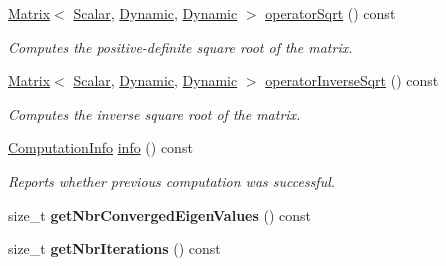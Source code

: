 \begin{DoxyCompactItemize}
\hyperlink{group___core___module_class_eigen_1_1_matrix}{Matrix}$<$ \hyperlink{class_eigen_1_1_arpack_generalized_self_adjoint_eigen_solver_ab1182405bfe87a505d4b7a8311c661ec}{Scalar}, \hyperlink{namespace_eigen_ad81fa7195215a0ce30017dfac309f0b2}{Dynamic}, \hyperlink{namespace_eigen_ad81fa7195215a0ce30017dfac309f0b2}{Dynamic} $>$ \hyperlink{class_eigen_1_1_arpack_generalized_self_adjoint_eigen_solver_a7522aad061ebccc065b254c0bc67d3b0}{operator\+Sqrt} () const
\begin{DoxyCompactList}\small\item\em Computes the positive-\/definite square root of the matrix. \end{DoxyCompactList}\item 
\hyperlink{group___core___module_class_eigen_1_1_matrix}{Matrix}$<$ \hyperlink{class_eigen_1_1_arpack_generalized_self_adjoint_eigen_solver_ab1182405bfe87a505d4b7a8311c661ec}{Scalar}, \hyperlink{namespace_eigen_ad81fa7195215a0ce30017dfac309f0b2}{Dynamic}, \hyperlink{namespace_eigen_ad81fa7195215a0ce30017dfac309f0b2}{Dynamic} $>$ \hyperlink{class_eigen_1_1_arpack_generalized_self_adjoint_eigen_solver_ad55f052b675f1deaea220d0cc225622a}{operator\+Inverse\+Sqrt} () const
\begin{DoxyCompactList}\small\item\em Computes the inverse square root of the matrix. \end{DoxyCompactList}\item 
\hyperlink{group__enums_ga85fad7b87587764e5cf6b513a9e0ee5e}{Computation\+Info} \hyperlink{class_eigen_1_1_arpack_generalized_self_adjoint_eigen_solver_a6f952eed50efe01b8cb91726e6a93b68}{info} () const
\begin{DoxyCompactList}\small\item\em Reports whether previous computation was successful. \end{DoxyCompactList}\item 
\mbox{\label{class_eigen_1_1_arpack_generalized_self_adjoint_eigen_solver_a932fe19093ee98c14c1c6d28a8c829b0}} 
size\+\_\+t {\bfseries get\+Nbr\+Converged\+Eigen\+Values} () const
\item 
\mbox{\label{class_eigen_1_1_arpack_generalized_self_adjoint_eigen_solver_afa3f79bab571b043f970ec4ca685a99c}} 
size\+\_\+t {\bfseries get\+Nbr\+Iterations} () const
\item 

\end{DoxyCompactItemize}
